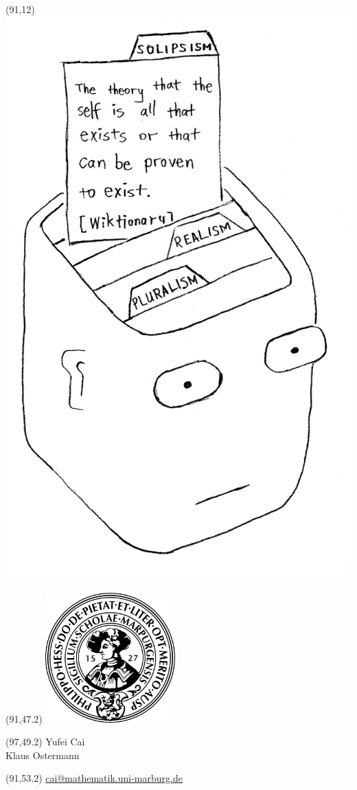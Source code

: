 \documentclass[a0]{a0poster}
\def\FONTSIZE#1{\fontsize{#1}{#1}\selectfont}
\begin{document}
\begin{textblock}{30}(91,12)
\includegraphics[width=21cm]{head.png}
\end{textblock}

\begin{textblock}{20}(91,47.2)
\includegraphics[width=5cm]{Siegel_Uni_Marburg.png}
\end{textblock}
\begin{textblock}{14}(97,49.2)
Yufei Cai\\
Klaus Ostermann
\end{textblock}
\begin{textblock}{20}(91,53.2)
\FONTSIZE{28}
\url{cai@mathematik.uni-marburg.de}
\end{textblock}
\end{document}
